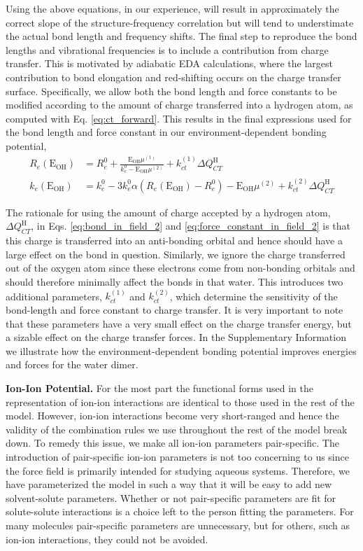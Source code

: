 \documentclass[journal=jctcce,manuscript=article]{achemso}
\begin{document}
Using the above equations, in our experience, will result in approximately the correct slope of the structure-frequency correlation but will tend to understimate the actual bond length and frequency shifts. The final step to reproduce the bond lengths and vibrational frequencies is to include a contribution from charge transfer. This is motivated by adiabatic EDA calculations, where the largest contribution to bond elongation and red-shifting occurs on the charge transfer surface.\cite{mao2017energy} Specifically, we allow both the bond length and force constants to be modified according to the amount of charge transferred into a hydrogen atom, as computed with Eq. \ref{eq:ct_forward}. This results in the final expressions used for the bond length and force constant in our environment-dependent bonding potential,
\begin{align}
  \label{eq:bond_in_field_2}
  R_e(\mathrm{E_{OH}})&=R_e^0+ \frac{\mathrm{E_{OH}}\mu^{(1)}}{k_e^0-\mathrm{E_{OH}}\mu^{(2)}} + k_{ct}^{(1)}\Delta Q_{CT}^{\mathrm{H}} \\
  \label{eq:force_constant_in_field_2}
  k_e(\mathrm{E_{OH}})&=k_e^0-3k_e^0\alpha\left(R_e(\mathrm{E_{OH}})-R_e^0\right)-\mathrm{E_{OH}}\mu^{(2)}+k_{ct}^{(2)}\Delta Q_{CT}^{\mathrm{H}}
\end{align}

The rationale for using the amount of charge accepted by a hydrogen atom, $\Delta Q_{CT}^{\mathrm{H}}$, in Eqs. \ref{eq:bond_in_field_2} and \ref{eq:force_constant_in_field_2} is that this charge is transferred into an anti-bonding orbital and hence should have a large effect on the  bond in question. Similarly, we ignore the charge transferred out of the oxygen atom since these electrons come from non-bonding orbitals and should therefore minimally affect the  bonds in that water. This introduces two additional parameters, $k_{ct}^{(1)}$ and $k_{ct}^{(2)}$, which determine the sensitivity of the bond-length and force constant to charge transfer. It is very important to note that these parameters have a very small effect on the charge transfer energy, but a sizable effect on the charge transfer forces. In the Supplementary Information we illustrate how the environment-dependent bonding potential improves energies and forces for the water dimer. 

\textbf{Ion-Ion Potential.}
For the most part the functional forms used in the representation of ion-ion interactions are identical to those used in the rest of the model. However, ion-ion interactions become very short-ranged and hence the validity of the combination rules we use throughout the rest of the model break down. To remedy this issue, we make all ion-ion parameters pair-specific. The introduction of pair-specific ion-ion parameters is not too concerning to us since the force field is primarily intended for studying aqueous systems. Therefore, we have parameterized the model in such a way that it will be easy to add new solvent-solute parameters. Whether or not pair-specific parameters are fit for solute-solute interactions is a choice left to the person fitting the parameters. For many molecules pair-specific parameters are unnecessary, but for others, such as ion-ion interactions, they could not be avoided.
\end{document}
